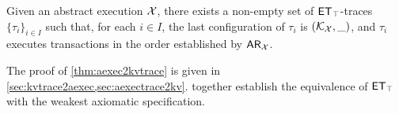 

\begin{theorem}
\label{thm:aexec2kvtrace}
Given an abstract execution \(\mathcal{X}\), there exists a non-empty 
set of \(\mathsf{ET}_{\top}\)-traces \(\{\tau_{i}\}_{i \in I}\) such that, for each \(i \in I\), the last configuration of \(\tau_{i}\) is 
\((\mathcal{K}_{\mathcal{X}}, \_)\), and \(\tau_{i}\) executes transactions in the order established by \(\mathsf{AR}_{\mathcal{X}}\). 
\end{theorem}
\noindent The proof of \cref{thm:aexec2kvtrace} is given 
in \cref{sec:kvtrace2aexec,sec:aexectrace2kv}. 
 together establish the
equivalence  of \(\mathsf{ET}_{\top}\) with the weakest axiomatic specification. 

